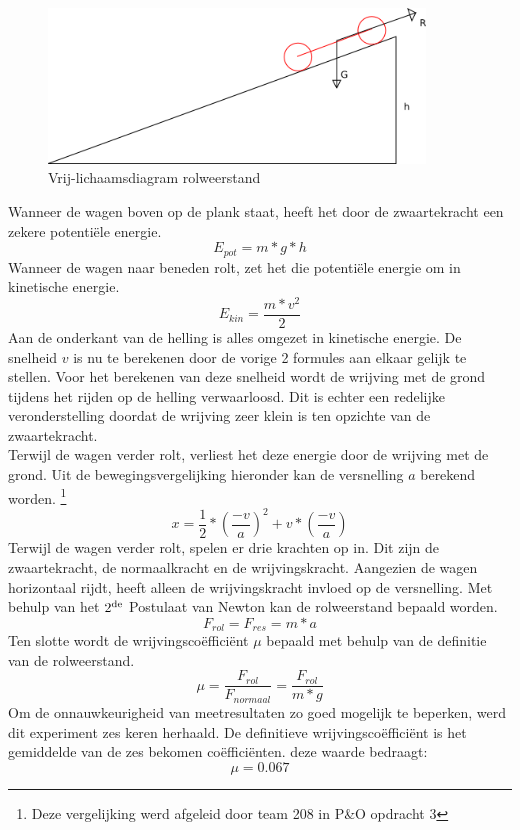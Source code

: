 \begin{figure}[here]
\includegraphics[width=10cm]{bijlagen/rolweerstand/rolweerstand.png}
\caption{Vrij-lichaamsdiagram rolweerstand}
\label{image:rolweerstand}
\end{figure}
Wanneer de wagen boven op de plank staat, heeft het door de zwaartekracht een zekere potenti\"ele energie.
\begin{equation}
E_{pot}=m*g*h
\end{equation}
Wanneer de wagen naar beneden rolt, zet het die potenti\"ele energie om in kinetische energie.
\begin{equation}
E_{kin}=\frac{m*v^2}{2}
\end{equation}
Aan de onderkant van de helling is alles omgezet in kinetische energie. De snelheid $v$ is nu te berekenen door de vorige 2 formules aan elkaar gelijk te stellen. Voor het berekenen van deze snelheid wordt de wrijving met de grond tijdens het rijden op de helling verwaarloosd. Dit is echter een redelijke veronderstelling doordat de wrijving zeer klein is ten opzichte van de zwaartekracht.\\
Terwijl de wagen verder rolt, verliest het deze energie door de wrijving met de grond. Uit de bewegingsvergelijking hieronder kan de versnelling $a$ berekend worden.
\footnote{Deze vergelijking werd afgeleid door team 208 in P\&O opdracht 3}
\begin{equation}
x=\frac{1}{2}*\left(\frac{-v}{a}\right)^2+v*\left(\frac{-v}{a}\right)
\end{equation}
Terwijl de wagen verder rolt, spelen er drie krachten op in. Dit zijn de zwaartekracht, de normaalkracht en de wrijvingskracht. Aangezien de wagen horizontaal rijdt, heeft alleen de wrijvingskracht invloed op de versnelling. Met behulp van het $2\textsuperscript{de}$ Postulaat van Newton kan de rolweerstand bepaald worden.
\begin{equation}
F_{rol}=F_{res}=m*a
\end{equation}
Ten slotte wordt de wrijvingsco\"effici\"ent $\mu$ bepaald met behulp van de definitie van de rolweerstand.
\begin{equation}
\mu=\frac{F_{rol}}{F_{normaal}}=\frac{F_{rol}}{m*g}
\end{equation}
Om de onnauwkeurigheid van meetresultaten zo goed mogelijk te beperken, werd dit experiment zes keren herhaald. De definitieve wrijvingscoëffici\"ent is het gemiddelde van de zes bekomen coëfficiënten. deze waarde bedraagt:$$\mu=0.067$$
